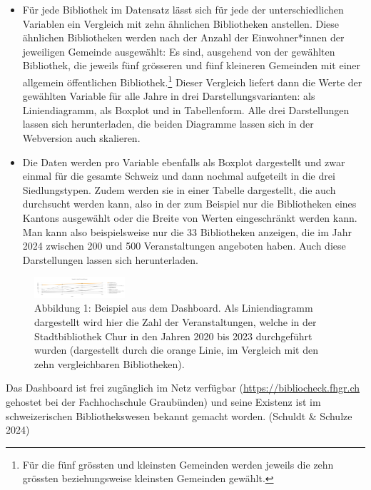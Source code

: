 \documentclass[a4paper,
fontsize=11pt,
oneside,
numbers=noperiodatend,
parskip=half-,
bibliography=totoc,
final
]{scrartcl}
\begin{document}
\begin{itemize}
\item
  Für jede Bibliothek im Datensatz lässt sich für jede der
  unterschiedlichen Variablen ein Vergleich mit zehn ähnlichen
  Bibliotheken anstellen. Diese ähnlichen Bibliotheken werden nach der
  Anzahl der Einwohner*innen der jeweiligen Gemeinde ausgewählt: Es
  sind, ausgehend von der gewählten Bibliothek, die jeweils fünf
  grösseren und fünf kleineren Gemeinden mit einer allgemein
  öffentlichen Bibliothek.\footnote{Für die fünf grössten und kleinsten
    Gemeinden werden jeweils die zehn grössten beziehungsweise kleinsten
    Gemeinden gewählt.} Dieser Vergleich liefert dann die Werte der
  gewählten Variable für alle Jahre in drei Darstellungsvarianten: als
  Liniendiagramm, als Boxplot und in Tabellenform. Alle drei
  Darstellungen lassen sich herunterladen, die beiden Diagramme lassen
  sich in der Webversion auch skalieren.
\item
  Die Daten werden pro Variable ebenfalls als Boxplot dargestellt und
  zwar einmal für die gesamte Schweiz und dann nochmal aufgeteilt in die
  drei Siedlungstypen. Zudem werden sie in einer Tabelle dargestellt,
  die auch durchsucht werden kann, also in der zum Beispiel nur die
  Bibliotheken eines Kantons ausgewählt oder die Breite von Werten
  eingeschränkt werden kann. Man kann also beispielsweise nur die 33
  Bibliotheken anzeigen, die im Jahr 2024 zwischen 200 und 500
  Veranstaltungen angeboten haben. Auch diese Darstellungen lassen sich
  herunterladen.
\end{itemize}

\begin{figure}
\centering
\includegraphics[angle=90,width=0.3\textwidth]{img/Abbildung01.PNG}
\caption{Abbildung 1: Beispiel aus dem Dashboard. Als Liniendiagramm
dargestellt wird hier die Zahl der Veranstaltungen, welche in der
Stadtbibliothek Chur in den Jahren 2020 bis 2023 durchgeführt wurden
(dargestellt durch die orange Linie, im Vergleich mit den zehn
vergleichbaren Bibliotheken).}
\end{figure}

Das Dashboard ist frei zugänglich im Netz verfügbar
(\url{https://bibliocheck.fhgr.ch} gehostet bei der Fachhochschule
Graubünden) und seine Existenz ist im schweizerischen Bibliothekswesen
bekannt gemacht worden. (Schuldt \& Schulze 2024)
\end{document}
